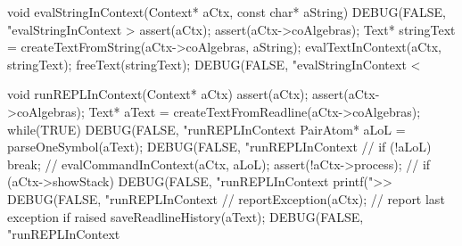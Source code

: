 void evalStringInContext(Context* aCtx, const char* aString) {
  DEBUG(FALSE, "evalStringInContext > %
  assert(aCtx);
  assert(aCtx->coAlgebras);
  Text* stringText = createTextFromString(aCtx->coAlgebras, aString);
  evalTextInContext(aCtx, stringText);
  freeText(stringText);
  DEBUG(FALSE, "evalStringInContext < %
}

void runREPLInContext(Context* aCtx) {
  assert(aCtx);
  assert(aCtx->coAlgebras);
  Text* aText = createTextFromReadline(aCtx->coAlgebras);
  while(TRUE) {
    DEBUG(FALSE, "runREPLInContext %
    PairAtom* aLoL = parseOneSymbol(aText);
    DEBUG(FALSE, "runREPLInContext %
    //
    if (!aLoL) break;
    //
    evalCommandInContext(aCtx, aLoL);
    assert(!aCtx->process);
    //
    if (aCtx->showStack) {
      DEBUG(FALSE, "runREPLInContext %
      printf(">>%
      DEBUG(FALSE, "runREPLInContext %
    }
    //
    reportException(aCtx); // report last exception if raised
  }
  saveReadlineHistory(aText);
  DEBUG(FALSE, "runREPLInContext %
}
\stopCCode